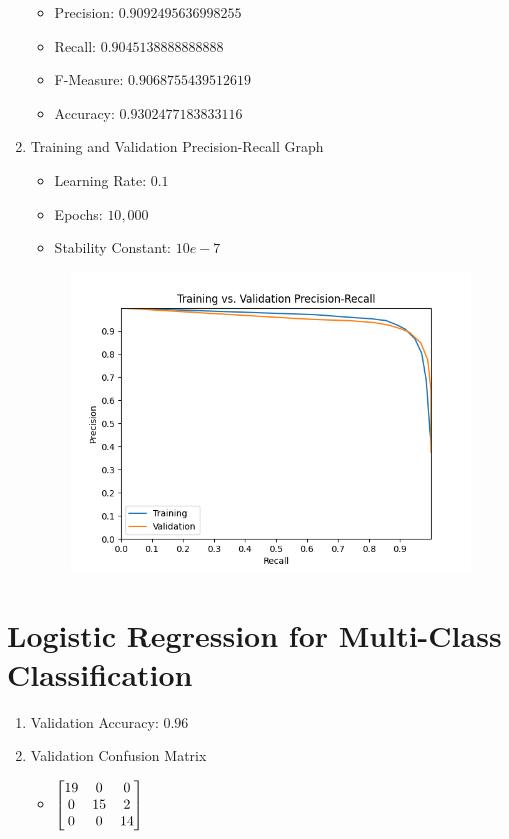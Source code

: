 \documentclass[12pt]{article}
\begin{document}
\begin{enumerate}
   \begin{itemize}
    \item Precision: $0.9092495636998255$
     \item Recall: $0.9045138888888888$
     \item F-Measure: $0.9068755439512619$
     \item Accuracy: $0.9302477183833116$
   \end{itemize}
   \item Training and Validation Precision-Recall Graph
   \begin{itemize}
     \item Learning Rate: $0.1$
     \item Epochs: $10,000$
     \item Stability Constant: $10e-7$
   \end{itemize}
    \begin{figure}[H]
        \begin{center}
        \includegraphics{images/training_validation_precision_recall_graph.png}
        \label{GD}
        \end{center}
    \end{figure}
\end{enumerate}

\newpage
\section{Logistic Regression for Multi-Class Classification}\label{naive}
\begin{enumerate}
   \item Validation Accuracy: $0.96$
   \item Validation Confusion Matrix
   \begin{itemize}
     \item $
        \begin{bmatrix}
        19 & 0 & 0\\
        0 & 15 & 2\\
        0 & 0 & 14
        \end{bmatrix}\\$
   \end{itemize}
\end{enumerate}
\end{document}
